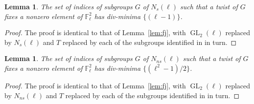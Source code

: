 \documentclass[table,dvipsnames]{amsart}
\newcommand{\F}{\mathbb{F}}
\newcommand{\GL}{\operatorname{GL}}
\newtheorem{lemma}[theorem]{Lemma}
\numberwithin{equation}{section}
\newcommand{\s}{\textit{s}}
\newcommand{\ns}{\textit{ns}}
\newcommand{\Ns}{N_\s}
\newcommand{\Nns}{N_\ns}
\begin{document}
\begin{lemma}
\label{lem:sj}
The set of indices of subgroups $G$ of $\Ns(\ell)$ such that a twist of $G$ fixes a nonzero element of $\F_\ell^2$ has div-minima $\{(\ell-1)\}$.
\end{lemma}
\begin{proof}
The proof is identical to that of Lemma~\ref{lem:fj}, with $\GL_2(\ell)$ replaced by $\Ns(\ell)$ and $T$ replaced by each of the subgroups identified in \cite[Lem.~6.6]{lozanorobledo2013} in turn.
\end{proof}

\begin{lemma}
\label{lem:nj}
The set of indices of subgroups $G$ of $\Nns(\ell)$ such that a twist of $G$ fixes a nonzero element of $\F_\ell^2$ has div-minima $\{(\ell^2-1)/2\}$.
\end{lemma}
\begin{proof}
The proof is identical to that of Lemma~\ref{lem:fj}, with $\GL_2(\ell)$ replaced by $\Nns(\ell)$ and $T$ replaced by each of the subgroups identified in \cite[Lem.~7.4]{lozanorobledo2013} in turn.
\end{proof}
\end{document}
